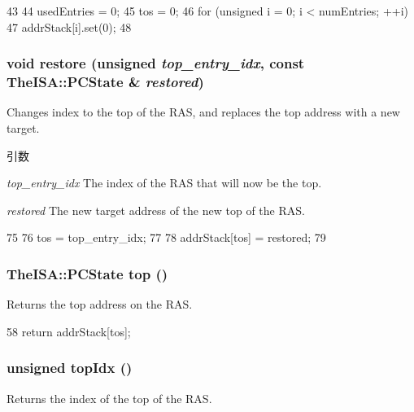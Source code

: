 \begin{DoxyCode}
43 {
44     usedEntries = 0;
45     tos = 0;
46     for (unsigned i = 0; i < numEntries; ++i)
47         addrStack[i].set(0);
48 }
\end{DoxyCode}
\hypertarget{classReturnAddrStack_ac208ad882bfb6aa015072a38b7816fdd}{
\subsubsection[{restore}]{\setlength{\rightskip}{0pt plus 5cm}void restore (unsigned {\em top\_\-entry\_\-idx}, \/  const TheISA::PCState \& {\em restored})}}
\label{classReturnAddrStack_ac208ad882bfb6aa015072a38b7816fdd}
Changes index to the top of the RAS, and replaces the top address with a new target. 
\begin{DoxyParams}{引数}
\item[{\em top\_\-entry\_\-idx}]The index of the RAS that will now be the top. \item[{\em restored}]The new target address of the new top of the RAS. \end{DoxyParams}



\begin{DoxyCode}
75 {
76     tos = top_entry_idx;
77 
78     addrStack[tos] = restored;
79 }
\end{DoxyCode}
\hypertarget{classReturnAddrStack_a4ec0e8cb31b1b16c826462529549c4bf}{
\subsubsection[{top}]{\setlength{\rightskip}{0pt plus 5cm}TheISA::PCState top ()}}
\label{classReturnAddrStack_a4ec0e8cb31b1b16c826462529549c4bf}
Returns the top address on the RAS. 


\begin{DoxyCode}
58     { return addrStack[tos]; }
\end{DoxyCode}
\hypertarget{classReturnAddrStack_a7e8bedc8c9dd0c3b75ca2a453fe971a1}{
\subsubsection[{topIdx}]{\setlength{\rightskip}{0pt plus 5cm}unsigned topIdx ()}}
\label{classReturnAddrStack_a7e8bedc8c9dd0c3b75ca2a453fe971a1}
Returns the index of the top of the RAS. 


